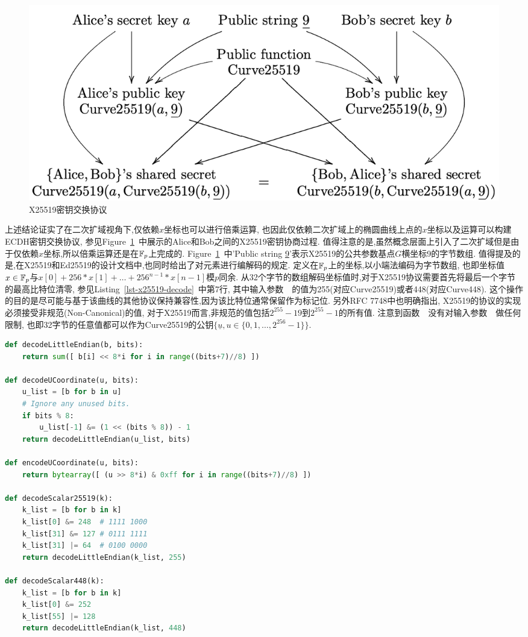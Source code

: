\begin{figure}[h]
\centering
\includegraphics[width=.8\textwidth]{x25519.png}
\caption{X25519密钥交换协议}\label{fig-x25519}
\end{figure}

上述结论证实了在二次扩域视角下,仅依赖$x$坐标也可以进行倍乘运算,
也因此仅依赖二次扩域上的椭圆曲线上点的$x$坐标以及运算可以构建ECDH密钥交换协议,
参见Figure~\ref{fig-x25519}~中展示的Alice和Bob之间的X25519密钥协商过程.
值得注意的是,虽然概念层面上引入了二次扩域但是由于仅依赖$x$坐标,所以倍乘运算还是在$\mathbb{F}_p$上完成的.
Figure~\ref{fig-x25519}~中'Public string \underline{9}'表示X25519的公共参数基点$G$横坐标9的字节数组.
值得提及的是,在X25519和Ed25519的设计文档中,也同时给出了对元素进行编解码的规定.
定义在$\mathbb{F}_p$上的坐标,以小端法编码为字节数组,
也即坐标值$x\in\mathbb{F}_p$与$x[0] + 256  *x[1] + \ldots + 256^{n-1} * x[n-1]$模$p$同余.
从32个字节的数组解码坐标值时,对于X25519协议需要首先将最后一个字节的最高比特位清零,
参见Listing~\ref{lst-x25519-decode}~中第7行,
其中输入参数~~的值为255(对应Curve25519)或者448(对应Curve448).
这个操作的目的是尽可能与基于该曲线的其他协议保持兼容性,因为该比特位通常保留作为标记位.
另外RFC 7748中也明确指出, X25519的协议的实现必须接受非规范(Non-Canonical)的值,
对于X25519而言,非规范的值包括$2^{255}-19$到$2^{255}-1$的所有值.
注意到函数~~没有对输入参数~~做任何限制,
也即32字节的任意值都可以作为Curve25519的公钥$\{\underline{u}, u\in \{0,1,\ldots,2^{256}-1\}\}$.





\begin{lstlisting}[language=python, caption=X25519和X448的编解码, label=lst-x25519-decode]
def decodeLittleEndian(b, bits):
    return sum([ b[i] << 8*i for i in range((bits+7)//8) ])

def decodeUCoordinate(u, bits):
    u_list = [b for b in u]
    # Ignore any unused bits.
    if bits % 8:
        u_list[-1] &= (1 << (bits % 8)) - 1
    return decodeLittleEndian(u_list, bits)

def encodeUCoordinate(u, bits):
    return bytearray([ (u >> 8*i) & 0xff for i in range((bits+7)//8) ])

def decodeScalar25519(k):
    k_list = [b for b in k]
    k_list[0] &= 248  # 1111 1000
    k_list[31] &= 127 # 0111 1111
    k_list[31] |= 64  # 0100 0000
    return decodeLittleEndian(k_list, 255)

def decodeScalar448(k):
    k_list = [b for b in k]
    k_list[0] &= 252
    k_list[55] |= 128
    return decodeLittleEndian(k_list, 448)
\end{lstlisting}

